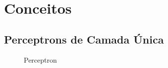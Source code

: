 \chapter{Conceitos}
\label{cap:conceitos}


\section{Perceptrons de Camada Única}
\label{sec:fundamentos}
\begin{figure}[!htpb] 
  \caption{Perceptron}
\end{figure}
